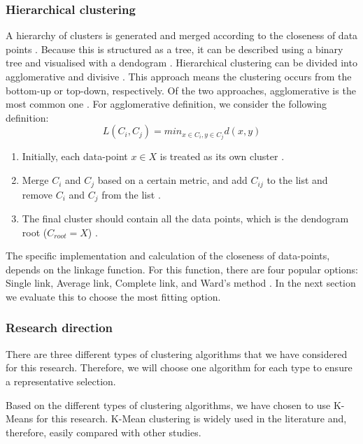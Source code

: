 \subsubsection{Hierarchical clustering}
A hierarchy of clusters is generated and merged according to the closeness of data points \citep{meng_private_2021}. Because this is structured as a tree, it can be described using a binary tree and visualised with a dendogram  \citep{nielsen_hierarchical_2016}.
Hierarchical clustering can be divided into agglomerative and divisive \citep{meng_private_2021}.
This approach means the clustering occurs from the bottom-up or top-down, respectively.
Of the two approaches, agglomerative is the most common one \citep{meng_private_2021}.
For  agglomerative definition, we consider the following definition:
\begin{equation}
    L(C_i, C_j) = min_{x \in C_i, y \in C_j} d(x, y)
\end{equation}
\begin{enumerate}
\item Initially, each data-point $x \in X$ is treated as its own cluster \citep{nielsen_hierarchical_2016}.
    \item Merge $C_i$ and $C_j$ based on a certain metric, and add $C_{ij}$ to the list and remove $C_i$ and $C_j$ from the list \citep{nielsen_hierarchical_2016}.
    \item The final cluster should contain all the data points, which is the dendogram root ($C_{root} = X$) \citep{nielsen_hierarchical_2016}.
\end{enumerate}
The specific implementation and calculation of the closeness of data-points, depends on the linkage function.
For this function, there are four popular options: Single link, Average link, Complete link, and Ward's method \citep{roux_comparative_2015}. In the next section we evaluate this to choose the most fitting option.

\subsubsection{Research direction}
There are three different types of clustering algorithms that we have considered for this research.
Therefore, we will choose one algorithm for each type to ensure a representative selection.

Based on the different types of clustering algorithms, we have chosen to use K-Means for this research.
K-Mean clustering is widely used in the literature and, therefore, easily compared with other studies.

